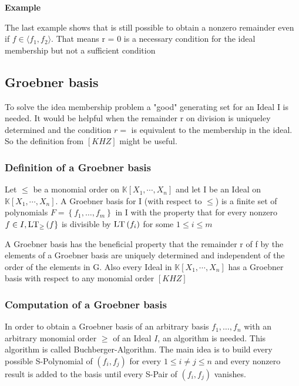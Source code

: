 \textbf{Example}


The last example shows that is still possible to obtain a nonzero remainder even if $f \in \langle f_{1},f_{2} \rangle $. That means r = 0 is a  necessary condition for the ideal membership but not a sufficient condition
\subsection{Groebner basis}

To solve the idea membership problem a "good" generating set for an Ideal I is needed. It would be helpful when the remainder r on division is uniqueley determined and the condition $ r = $ is equivalent to the membership in the ideal.
So the definition from $\left[KHZ \right]  $ might be useful.

\subsubsection{Definition of a Groebner basis}

\begin{env_definition}
Let $\leq$ be a monomial order on $\mathbb{K}\left[X_{1}, \cdots, X_{n}\right]$ and let I be an Ideal on $ \mathbb{K}\left[X_{1}, \cdots, X_{n}\right]  $. A Groebner basis for I (with respect to $\leq$) is a finite set of polynomials $ F = \left\lbrace f_{1}, \ldots , f_{m} \right\rbrace $ in I with the property that for every nonzero $ f \in I , \textsc{LT}_{\geq}\left( f\right\rbrace $ is divisible by $\textsc{LT}\left( f_{i}\right) $ for some $ 1 \leq i \leq m $

\end{env_definition}

A Groebner basis has the beneficial property that the remainder r of f by the elements of a Groebner basis are uniquely determined and independent of the order of the elements in G.
Also every Ideal in $\mathbb{K}\left[X_{1}, \cdots, X_{n}\right]$ has a Groebner basis with respect to any monomial order $\left[ KHZ\right] $

\subsubsection{Computation of a Groebner basis}

In order to obtain a Groebner basis of an arbitrary basis $f_{1}, \ldots , f_{n}$ with an arbitrary monomial order $\geq$ of an Ideal $I$, an algorithm is needed. This algorithm is called Buchberger-Algorithm. The main idea is to build every possible S-Polynomial of $\left( f_{i},f_{j}\right) $ for every $ 1 \leq i \neq j \leq n $ and every nonzero result is added to the basis until every S-Pair of $\left( f_{i},f_{j}\right) $ vanishes.

